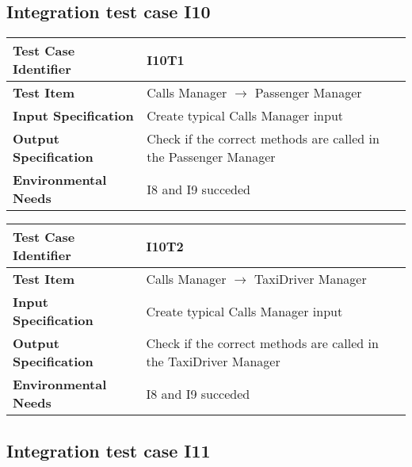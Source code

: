 \subsection{Integration test case I10}

\begin{table}[!htbp]
\begin{center}
\begin{tabular}[t]{p{}|p{}}

\hline
\textbf{Test Case Identifier} & I10T1 \\
\hline
\textbf{Test Item} & Calls Manager $\rightarrow$ Passenger Manager \\
\hline
\textbf{Input Specification} & Create typical Calls Manager input \\
\hline
\textbf{Output Specification} & Check if the correct methods are called in the Passenger Manager \\
\hline
\textbf{Environmental Needs} & I8 and I9 succeded \\
\hline

\end{tabular}
\end{center}
\end{table}

\begin{table}[!htbp]
\begin{center}
\begin{tabular}[t]{p{}|p{}}

\hline
\textbf{Test Case Identifier} & I10T2 \\
\hline
\textbf{Test Item} & Calls Manager $\rightarrow$ TaxiDriver Manager \\
\hline
\textbf{Input Specification} & Create typical Calls Manager input \\
\hline
\textbf{Output Specification} & Check if the correct methods are called in the TaxiDriver Manager \\
\hline
\textbf{Environmental Needs} & I8 and I9 succeded \\
\hline

\end{tabular}
\end{center}
\end{table}

\subsection{Integration test case I11}

